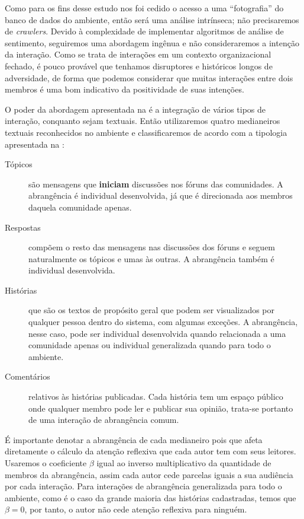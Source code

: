 Como para os fins desse estudo nos foi cedido o acesso a uma ``fotografia'' do
banco de dados do ambiente, então será uma análise intrínseca; não precisaremos
de \emph{crawlers}. Devido à complexidade de implementar algoritmos de análise de
sentimento, seguiremos uma abordagem ingênua e não consideraremos a intenção da
interação. Como se trata de interações em um contexto organizacional fechado, é
pouco provável que tenhamos disruptores e históricos longos de adversidade, de
forma que podemos considerar que muitas interações entre dois membros é uma bom
indicativo da positividade de suas intenções.

O poder da abordagem apresentada na  é a integração
de vários tipos de interação, conquanto sejam textuais. Então utilizaremos
quatro medianeiros textuais reconhecidos no ambiente e classificaremos de
acordo com a tipologia apresentada na :

\begin{description}
\item[Tópicos] são mensagens que \textbf{iniciam} discussões nos fóruns das
comunidades. A abrangência é individual desenvolvida, já que é direcionada aos
membros daquela comunidade apenas.
\item[Respostas] compõem o resto das mensagens nas discussões dos fóruns e
seguem naturalmente os tópicos e umas às outras. A abrangência também é
individual desenvolvida.
\item[Histórias] que são os textos de propósito geral que podem ser visualizados
por qualquer pessoa dentro do sistema, com algumas exceções. A abrangência,
nesse caso, pode ser individual desenvolvida quando relacionada a uma comunidade
apenas ou individual generalizada quando para todo o ambiente.
\item[Comentários] relativos às histórias publicadas. Cada história tem um
espaço público onde qualquer membro pode ler e publicar sua opinião, trata-se
portanto de uma interação de abrangência comum.
\end{description}

É importante denotar a abrangência de cada medianeiro pois que afeta diretamente
o cálculo da atenção reflexiva que cada autor tem com seus leitores. Usaremos o
coeficiente $\beta$ igual ao inverso multiplicativo da quantidade de membros da
abrangência, assim cada autor cede parcelas iguais a sua audiência por cada
interação. Para interações de abrangência generalizada para todo o ambiente, como
é o caso da grande maioria das histórias cadastradas, temos que $\beta=0$, por
tanto, o autor não cede atenção reflexiva para ninguém.


